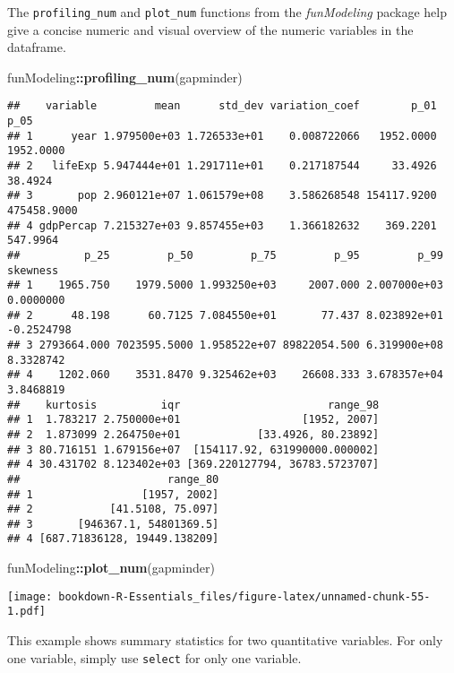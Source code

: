 \documentclass[]{book}
\newenvironment{Shaded}{\begin{snugshade}}{\end{snugshade}}
\newcommand{\KeywordTok}[1]{\textcolor[rgb]{0.13,0.29,0.53}{\textbf{#1}}}
\newcommand{\OperatorTok}[1]{\textcolor[rgb]{0.81,0.36,0.00}{\textbf{#1}}}
\newcommand{\NormalTok}[1]{#1}
\begin{document}
The \texttt{profiling\_num} and \texttt{plot\_num} functions from the
\emph{funModeling} package help give a concise numeric and visual
overview of the numeric variables in the dataframe.

\begin{Shaded}
\begin{Highlighting}[]
\NormalTok{funModeling}\OperatorTok{::}\KeywordTok{profiling_num}\NormalTok{(gapminder)}
\end{Highlighting}
\end{Shaded}

\begin{verbatim}
##    variable         mean      std_dev variation_coef        p_01        p_05
## 1      year 1.979500e+03 1.726533e+01    0.008722066   1952.0000   1952.0000
## 2   lifeExp 5.947444e+01 1.291711e+01    0.217187544     33.4926     38.4924
## 3       pop 2.960121e+07 1.061579e+08    3.586268548 154117.9200 475458.9000
## 4 gdpPercap 7.215327e+03 9.857455e+03    1.366182632    369.2201    547.9964
##          p_25         p_50         p_75         p_95         p_99   skewness
## 1    1965.750    1979.5000 1.993250e+03     2007.000 2.007000e+03  0.0000000
## 2      48.198      60.7125 7.084550e+01       77.437 8.023892e+01 -0.2524798
## 3 2793664.000 7023595.5000 1.958522e+07 89822054.500 6.319900e+08  8.3328742
## 4    1202.060    3531.8470 9.325462e+03    26608.333 3.678357e+04  3.8468819
##    kurtosis          iqr                       range_98
## 1  1.783217 2.750000e+01                   [1952, 2007]
## 2  1.873099 2.264750e+01            [33.4926, 80.23892]
## 3 80.716151 1.679156e+07  [154117.92, 631990000.000002]
## 4 30.431702 8.123402e+03 [369.220127794, 36783.5723707]
##                       range_80
## 1                 [1957, 2002]
## 2            [41.5108, 75.097]
## 3       [946367.1, 54801369.5]
## 4 [687.71836128, 19449.138209]
\end{verbatim}

\begin{Shaded}
\begin{Highlighting}[]
\NormalTok{funModeling}\OperatorTok{::}\KeywordTok{plot_num}\NormalTok{(gapminder)}
\end{Highlighting}
\end{Shaded}

\texttt{[image: bookdown-R-Essentials\_files/figure-latex/unnamed-chunk-55-1.pdf]}

This example shows summary statistics for two quantitative variables.
For only one variable, simply use \texttt{select} for only one variable.
\end{document}
